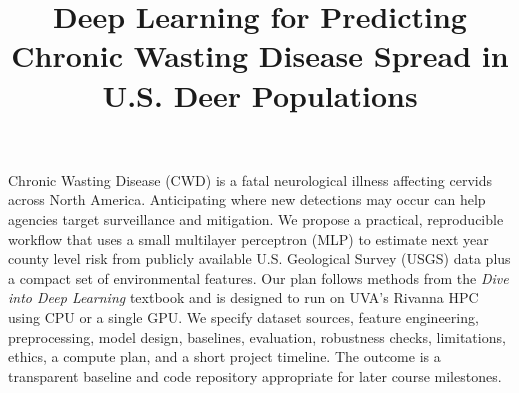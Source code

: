 \documentclass[conference]{IEEEtran}
\begin{document}
\title{Deep Learning for Predicting Chronic Wasting Disease Spread in U.S. Deer Populations}

\author{
\and
{}
\and
{}
}

\maketitle

\makeatletter
\renewenvironment{abstract}{%
  \if@twocolumn
    \section*{\abstractname}%
  \else
    \begin{center}\normalfont\bfseries \abstractname\end{center}%
  \fi
  \quotation
}{\endquotation}

\renewcommand\IEEEkeywordsname{Index Terms}
\renewenvironment{IEEEkeywords}{%
  \section*{\IEEEkeywordsname}\normalfont\normalsize
}{}
\makeatother


\begin{abstract}
Chronic Wasting Disease (CWD) is a fatal neurological illness affecting cervids across North America. Anticipating where new detections may occur can help agencies target surveillance and mitigation. We propose a practical, reproducible workflow that uses a small multilayer perceptron (MLP) to estimate next year county level risk from publicly available U.S. Geological Survey (USGS) data plus a compact set of environmental features. Our plan follows methods from the \textit{Dive into Deep Learning} textbook and is designed to run on UVA’s Rivanna HPC using CPU or a single GPU. We specify dataset sources, feature engineering, preprocessing, model design, baselines, evaluation, robustness checks, limitations, ethics, a compute plan, and a short project timeline. The outcome is a transparent baseline and code repository appropriate for later course milestones.
\end{abstract}
\end{document}

